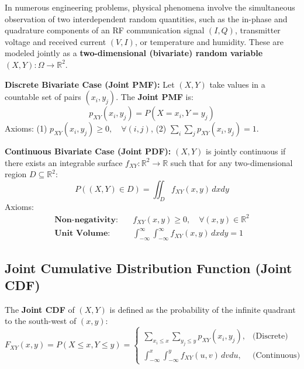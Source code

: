\documentclass[12pt,a4paper]{article}
\begin{document}
In numerous engineering problems, physical phenomena involve the simultaneous observation of two interdependent random quantities, such as the in-phase and quadrature components of an RF communication signal $(I, Q)$, transmitter voltage and received current $(V, I)$, or temperature and humidity. These are modeled jointly as a \textbf{two-dimensional (bivariate) random variable} $(X, Y): \Omega \to \mathbb{R}^2$.

\begin{tcolorbox}[defbox, title={\textbf{Definition: Joint Probability Mass and Density Functions}}]
\textbf{Discrete Bivariate Case (Joint PMF):}
Let $(X, Y)$ take values in a countable set of pairs $(x_i, y_j)$. The \textbf{Joint PMF} is:
\begin{equation}
  p_{XY}(x_i, y_j) = P(X = x_i, Y = y_j)
\end{equation}
Axioms: (1) $p_{XY}(x_i, y_j) \ge 0, \quad \forall (i, j)$, \quad (2) $\displaystyle\sum_{i} \sum_{j} p_{XY}(x_i, y_j) = 1$.

\textbf{Continuous Bivariate Case (Joint PDF):}
$(X, Y)$ is jointly continuous if there exists an integrable surface $f_{XY}: \mathbb{R}^2 \to \mathbb{R}$ such that for any two-dimensional region $D \subseteq \mathbb{R}^2$:
\begin{equation}
  P((X, Y) \in D) = \iint_D f_{XY}(x, y) \, dx dy
\end{equation}
Axioms:
\begin{align}
  \textbf{Non-negativity:} \quad & f_{XY}(x, y) \ge 0, \quad \forall (x, y) \in \mathbb{R}^2 \\[4pt]
  \textbf{Unit Volume:} \quad & \int_{-\infty}^\infty \int_{-\infty}^\infty f_{XY}(x, y) \, dx dy = 1
\end{align}
\end{tcolorbox}

\subsection{Joint Cumulative Distribution Function (Joint CDF)}
The \textbf{Joint CDF} of $(X, Y)$ is defined as the probability of the infinite quadrant to the south-west of $(x, y)$:
\begin{equation}
  F_{XY}(x, y) = P(X \le x, Y \le y) =
  \begin{cases}
    \displaystyle\sum_{x_i \le x} \sum_{y_j \le y} p_{XY}(x_i, y_j), & \text{(Discrete)} \\[10pt]
    \displaystyle\int_{-\infty}^x \int_{-\infty}^y f_{XY}(u, v) \, dv du, & \text{(Continuous)}
  \end{cases}
\end{equation}
\end{document}
